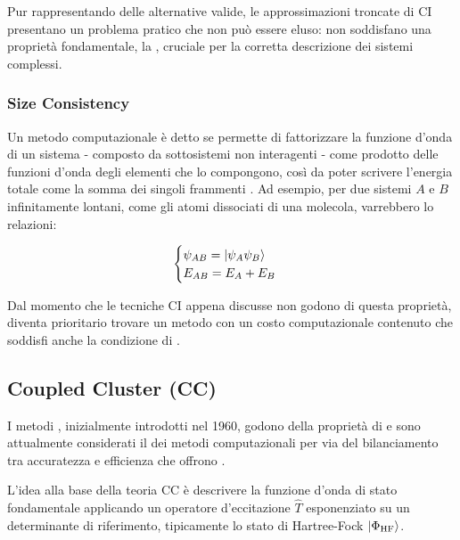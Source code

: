 Pur rappresentando delle alternative valide, le approssimazioni troncate di CI presentano un problema pratico che non può essere eluso: non soddisfano una proprietà fondamentale, la , cruciale per la corretta descrizione dei sistemi complessi.

\subsubsection{Size Consistency}

Un metodo computazionale è detto  se permette di fattorizzare la funzione d'onda di un sistema - composto da sottosistemi non interagenti - come prodotto delle funzioni d'onda degli elementi che lo compongono, così da poter scrivere l'energia totale come la somma dei singoli frammenti \cite{Anand_2022}. Ad esempio, per due sistemi $A$ e $B$ infinitamente lontani, come gli atomi dissociati di una molecola, varrebbero lo relazioni:

\begin{equation}\label{eqn:size-consistency}
\begin{cases}
    \psi_{AB} = \ket{\psi_A\psi_B}\\
    E_{AB} = E_A + E_B
\end{cases}
\end{equation}

Dal momento che le tecniche CI appena discusse non godono di questa proprietà, diventa prioritario trovare un metodo con un costo computazionale contenuto che soddisfi anche la condizione di .

\subsection{Coupled Cluster (CC)}\label{subsec:coupled-cluster}

I metodi , inizialmente introdotti nel 1960, godono della proprietà di  e sono attualmente considerati il  dei metodi computazionali per via del bilanciamento tra accuratezza e efficienza che offrono \cite{Anand_2022,Bartlett_2007}. 

L'idea alla base della teoria CC è descrivere la funzione d'onda di stato fondamentale applicando un operatore d'eccitazione $\hat{T}$ esponenziato su un determinante di riferimento, tipicamente lo stato di Hartree-Fock $\ket{\Phi_{\text{HF}}}$.

